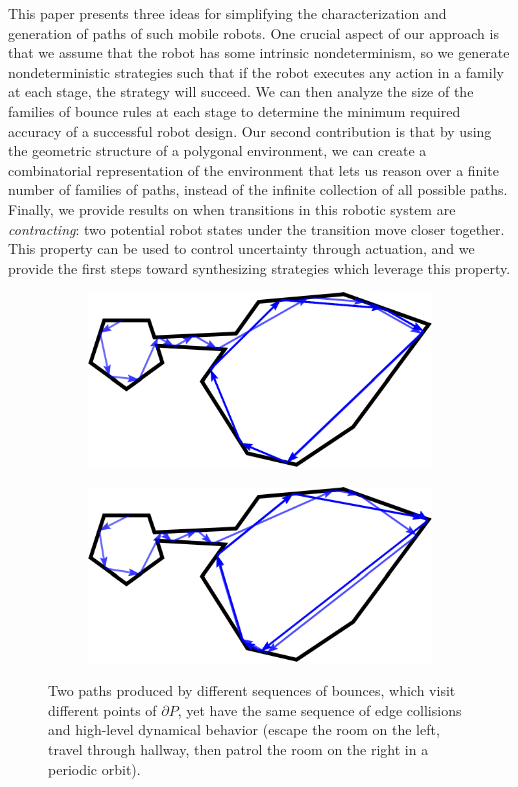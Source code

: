 \documentclass[]{styles/svproc}  %
\begin{document}
This paper presents three ideas for simplifying the characterization and
generation of paths of such mobile robots. One crucial
aspect of our approach is that we assume that the robot has some intrinsic
nondeterminism, so we generate nondeterministic strategies such that if the
robot executes any action in a family at each stage, the strategy will succeed.
We can then analyze the size of the families of bounce rules at each stage to
determine the minimum required accuracy of a successful robot design.
Our second contribution is that by using the geometric
structure of a polygonal environment, we can create a combinatorial
representation of the environment that lets us reason over a finite number of
families of paths, instead of the infinite collection of all possible paths.
Finally, we provide results on when transitions in this robotic system are 
\emph{contracting}: two potential robot states under the transition move closer together. 
This property can be used to control uncertainty through actuation, and we
provide the first steps toward synthesizing strategies which leverage this
property.

\begin{figure}
\centering
\begin{subfigure}{0.5\textwidth}
\includegraphics[width=\linewidth]{figures/twoc_a}
\end{subfigure}%
\begin{subfigure}{0.5\textwidth}
\includegraphics[width=\linewidth]{figures/twoc_b}
\end{subfigure}
\caption{Two paths produced by different sequences of bounces, which visit
different points of $\partial P$, yet have the same sequence of edge collisions 
and high-level dynamical behavior (escape the room on the left, travel through hallway, then
patrol the room on the right in a periodic orbit).
}

\label{fig:twopaths}
\end{figure}
\end{document}
